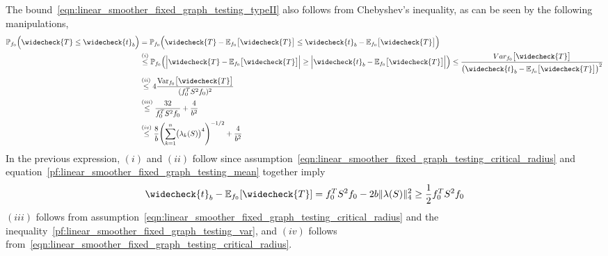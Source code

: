\documentclass[twoside]{article}
\newcommand{\Var}{\mathrm{Var}}
\newcommand{\1}{\mathbf{1}}
\newcommand{\Pbb}{\mathbb{P}}
\newcommand{\Ebb}{\mathbb{E}}
\newcommand{\wc}[1]{\widecheck{#1}}
\theoremstyle{definition}
\theoremstyle{remark}
\begin{document}
The bound~\eqref{eqn:linear_smoother_fixed_graph_testing_typeII} also follows from Chebyshev's inequality, as can be seen by the following manipulations,
\begin{equation*}
\begin{aligned}
\Pbb_{f_0}\Bigl(\wc{T} \leq \wc{t}_b\Bigr) & = \Pbb_{f_0}\Bigl(\wc{T} - \Ebb_{f_0}\bigl[\wc{T}\bigr] \leq \wc{t}_b - \Ebb_{f_0}\bigl[\wc{T}\bigr]\Bigr) \\
& \overset{(i)}{\leq} \Pbb_{f_0}\Bigl(\Bigl|\wc{T} - \Ebb_{f_0}\bigl[\wc{T}\bigr]\Bigr| \geq \Bigl|\wc{t}_b - \Ebb_{f_0}\bigl[\wc{T}\bigr]\Bigr|\Bigr) \leq \frac{Var_{f_0}\bigl[\wc{T}\bigr]}{\bigl(\wc{t}_b - \Ebb_{f_0}\bigl[\wc{T}\bigr]\bigr)^2} \\ 
& \overset{(ii)}{\leq} 4 \frac{\Var_{f_0}\bigl[\wc{T}\bigr]}{(f_0^T S^2 f_0)^2} \\
& \overset{(iii)}{\leq} \frac{32}{f_0^T S^2 f_0} + \frac{4}{b^2} \\
& \overset{(iv)}{\leq} \frac{8}{b} \Biggl(\sum_{k = 1}^{n}\bigl(\lambda_k(S)\bigr)^4\Biggr)^{-1/2} + \frac{4}{b^2}
\end{aligned}
\end{equation*}
In the previous expression, $(i)$ and $(ii)$ follow since assumption~\eqref{eqn:linear_smoother_fixed_graph_testing_critical_radius} and equation~\eqref{pf:linear_smoother_fixed_graph_testing_mean} together imply 
\begin{equation*}
\wc{t}_b - \Ebb_{f_0}[\wc{T}] = f_0^T S^2 f_0 - 2b\|{\bf \lambda}(S)\|_4^2 \geq \frac{1}{2}f_0^T S^2 f_0
\end{equation*}
$(iii)$ follows from assumption~\eqref{eqn:linear_smoother_fixed_graph_testing_critical_radius} and the inequality~\eqref{pf:linear_smoother_fixed_graph_testing_var}, and $(iv)$ follows from~\eqref{eqn:linear_smoother_fixed_graph_testing_critical_radius}. 
\end{document}
